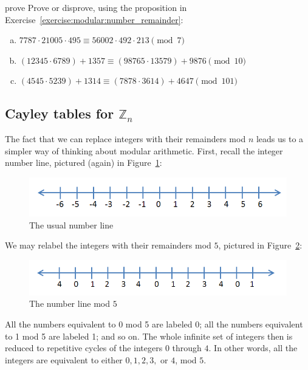 \begin{exercise}{prove}
Prove or disprove, using the proposition in Exercise~\ref{exercise:modular:number_remainder}:
\begin{enumerate}[(a)]
\item
$7787 \cdot 21005 \cdot 495 \equiv 56002 \cdot  492 \cdot 213 \pmod{7}$
\item
$(12345 \cdot 6789) + 1357 \equiv (98765 \cdot 13579) + 9876 \pmod{10}$
\item
$(4545 \cdot 5239) + 1314 \equiv (7878 \cdot 3614) + 4647 \pmod{101}$

\end{enumerate}
\end{exercise}


\subsection{Cayley tables for ${\mathbb Z}_n$}\label{sec:cayleyForZn1}
The fact that we can replace integers with their remainders mod $n$ leads us to a simpler way of  thinking about modular arithmetic.  First, recall the integer number line, pictured (again) in Figure~\ref{fig:integers}:
\begin{figure}[h]
\begin{center}
\includegraphics[width=4.5in]{images/integer_line.png}
\end{center}
\caption{The usual number line\label{fig:integers}}
\end{figure}
We may relabel the integers with their remainders mod $5$, pictured in Figure~\ref{fig:integers_mod_5}:
\begin{figure}[h]
\begin{center}
\includegraphics[width=4.5in]{images/integers_mod_5.png}
\end{center}
\caption{The number line mod $5$ \label{fig:integers_mod_5}}
\end{figure}
All the numbers equivalent to 0 mod 5 are labeled 0; all the numbers equivalent to 1 mod 5 are labeled 1; and so on.  The whole infinite set of integers then is reduced to repetitive cycles of the integers $0$ through $4$.  In other words, all the integers are equivalent to either $0, 1, 2, 3,$ or $4$, mod $5$.  


